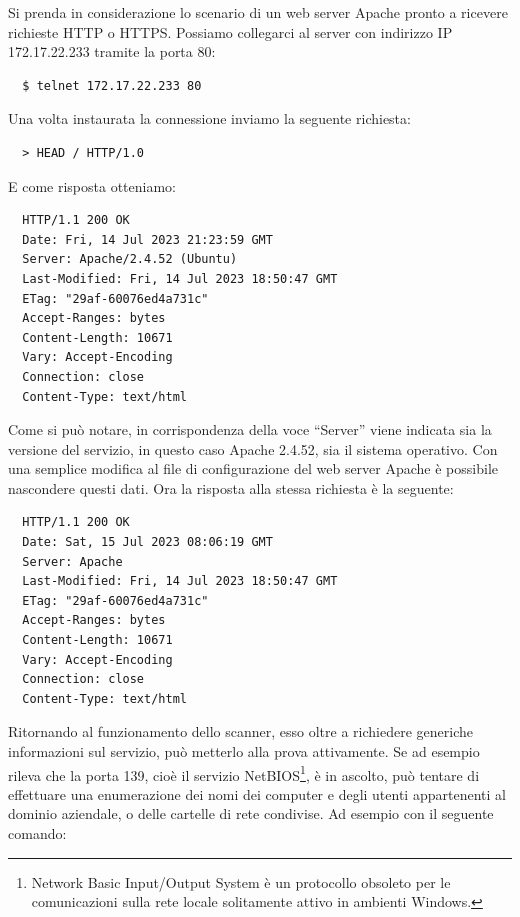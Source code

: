 \documentclass[target=mst,aauheader=]{thud}
\begin{document}
Si prenda in considerazione lo scenario di un web server Apache pronto a ricevere richieste HTTP o HTTPS. Possiamo collegarci al server con indirizzo IP 172.17.22.233 tramite la porta 80:

\begin{verbatim}
  $ telnet 172.17.22.233 80
\end{verbatim}

Una volta instaurata la connessione inviamo la seguente richiesta:

\begin{verbatim}
  > HEAD / HTTP/1.0
\end{verbatim}

E come risposta otteniamo:

\begin{verbatim}
  HTTP/1.1 200 OK
  Date: Fri, 14 Jul 2023 21:23:59 GMT
  Server: Apache/2.4.52 (Ubuntu)
  Last-Modified: Fri, 14 Jul 2023 18:50:47 GMT
  ETag: "29af-60076ed4a731c"
  Accept-Ranges: bytes
  Content-Length: 10671
  Vary: Accept-Encoding
  Connection: close
  Content-Type: text/html
\end{verbatim}

Come si può notare, in corrispondenza della voce “Server” viene indicata sia la versione del servizio, in questo caso Apache 2.4.52, sia il sistema operativo. Con una semplice modifica al file di configurazione del web server Apache è possibile nascondere questi dati. Ora la risposta alla stessa richiesta è la seguente:

\begin{verbatim}
  HTTP/1.1 200 OK
  Date: Sat, 15 Jul 2023 08:06:19 GMT
  Server: Apache
  Last-Modified: Fri, 14 Jul 2023 18:50:47 GMT
  ETag: "29af-60076ed4a731c"
  Accept-Ranges: bytes
  Content-Length: 10671
  Vary: Accept-Encoding
  Connection: close
  Content-Type: text/html
\end{verbatim}

Ritornando al funzionamento dello scanner, esso oltre a richiedere generiche informazioni sul servizio, può metterlo alla prova attivamente. Se ad esempio rileva che la porta 139, cioè il servizio NetBIOS\footnote{Network Basic Input/Output System è un protocollo obsoleto per le comunicazioni sulla rete locale solitamente attivo in ambienti Windows.}, è in ascolto, può tentare di effettuare una enumerazione dei nomi dei computer e degli utenti appartenenti al dominio aziendale, o delle cartelle di rete condivise. Ad esempio con il seguente comando:
\end{document}
